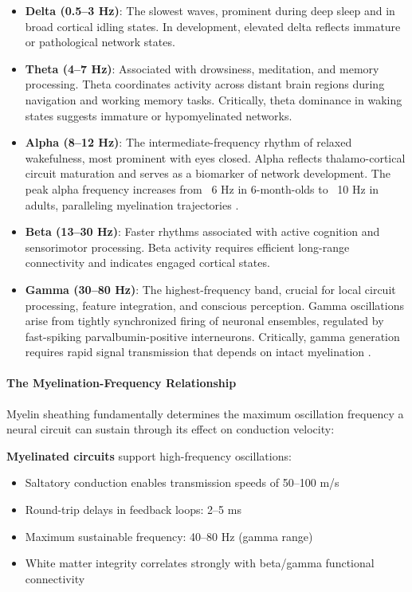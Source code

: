 \documentclass[11pt]{article}
\begin{document}
\begin{itemize}
\item \textbf{Delta (0.5--3 Hz)}: The slowest waves, prominent during deep sleep and in broad cortical idling states. In development, elevated delta reflects immature or pathological network states.

\item \textbf{Theta (4--7 Hz)}: Associated with drowsiness, meditation, and memory processing. Theta coordinates activity across distant brain regions during navigation and working memory tasks. Critically, theta dominance in waking states suggests immature or hypomyelinated networks.

\item \textbf{Alpha (8--12 Hz)}: The intermediate-frequency rhythm of relaxed wakefulness, most prominent with eyes closed. Alpha reflects thalamo-cortical circuit maturation and serves as a biomarker of network development. The peak alpha frequency increases from ~6 Hz in 6-month-olds to ~10 Hz in adults, paralleling myelination trajectories \citep{saby2012}.

\item \textbf{Beta (13--30 Hz)}: Faster rhythms associated with active cognition and sensorimotor processing. Beta activity requires efficient long-range connectivity and indicates engaged cortical states.

\item \textbf{Gamma (30--80 Hz)}: The highest-frequency band, crucial for local circuit processing, feature integration, and conscious perception. Gamma oscillations arise from tightly synchronized firing of neuronal ensembles, regulated by fast-spiking parvalbumin-positive interneurons. Critically, gamma generation requires rapid signal transmission that depends on intact myelination \citep{dubey2022}.
\end{itemize}

\paragraph{The Myelination-Frequency Relationship}
Myelin sheathing fundamentally determines the maximum oscillation frequency a neural circuit can sustain through its effect on conduction velocity:

\textbf{Myelinated circuits} support high-frequency oscillations:
\begin{itemize}
\item Saltatory conduction enables transmission speeds of 50--100 m/s
\item Round-trip delays in feedback loops: 2--5 ms
\item Maximum sustainable frequency: 40--80 Hz (gamma range)
\item White matter integrity correlates strongly with beta/gamma functional connectivity \citep{stitt2021}
\end{itemize}
\end{document}
